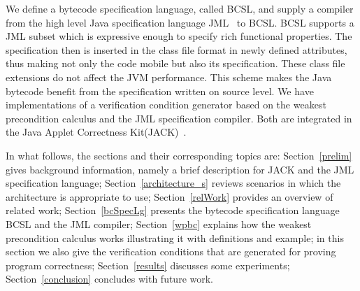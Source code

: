 We define a bytecode specification language, called BCSL, and supply a compiler from 
 the high level Java specification language JML~\cite{JMLRefMan} to BCSL. 
 BCSL supports a JML subset which is expressive enough to specify rich functional properties. The specification then is 
 inserted in the class file format in newly defined attributes, thus making not only the code mobile but also its specification. These class
 file extensions do not affect the JVM performance. This scheme makes the Java bytecode benefit from the specification written on source level.
 We have implementations of a verification condition generator based on the weakest precondition calculus and the JML 
specification compiler. Both are integrated in the Java Applet Correctness Kit(JACK)~\cite{BRL-JACK}.
  
In what follows, the sections and their corresponding topics are: 
Section~\ref{prelim} gives background information, namely a brief description for JACK and the JML specification language; Section~\ref{architecture_s} reviews scenarios in which the architecture is appropriate to use; Section~\ref{relWork} provides an overview of related work; Section~\ref{bcSpecLg} presents the bytecode 
specification language BCSL and the JML compiler; Section~\ref{wpbc} explains how the weakest precondition calculus works illustrating it with definitions and example; in this section we also give the verification conditions that are generated for 
proving program correctness; Section~\ref{results} discusses some experiments; Section~\ref{conclusion} concludes with future work.  















